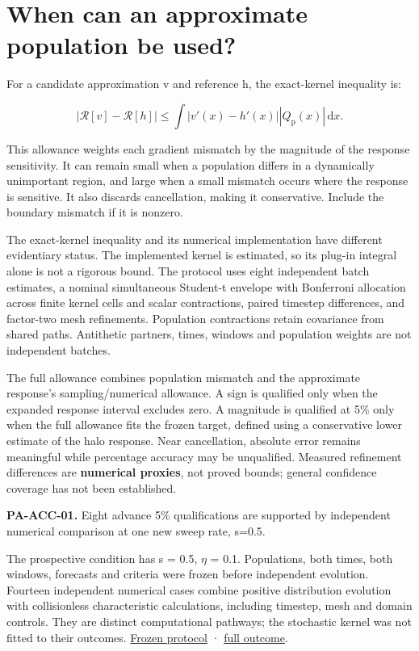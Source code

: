 \documentclass[fleqn,usenatbib]{mnras}
\begin{document}
\section{When can an approximate population be used?}\label{accuracy}

For a candidate approximation v and reference h, the exact-kernel inequality is:

\begin{equation}\label{EQ-ERR-01}
\left|\mathcal R[v]-\mathcal R[h]\right|
\leq \int\left|v'(x)-h'(x)\right|\left|Q_{\mathrm p}(x)\right|\,\mathrm dx.
\end{equation}

This allowance weights each gradient mismatch by the magnitude of the response sensitivity. It can remain small when a population differs in a dynamically unimportant region, and large when a small mismatch occurs where the response is sensitive. It also discards cancellation, making it conservative. Include the boundary mismatch if it is nonzero.

The exact-kernel inequality and its numerical implementation have different evidentiary status. The implemented kernel is estimated, so its plug-in integral alone is not a rigorous bound. The protocol uses eight independent batch estimates, a nominal simultaneous Student-t envelope with Bonferroni allocation across finite kernel cells and scalar contractions, paired timestep differences, and factor-two mesh refinements. Population contractions retain covariance from shared paths. Antithetic partners, times, windows and population weights are not independent batches.

The full allowance combines population mismatch and the approximate response's sampling/numerical allowance. A sign is qualified only when the expanded response interval excludes zero. A magnitude is qualified at 5\% only when the full allowance fits the frozen target, defined using a conservative lower estimate of the halo response. Near cancellation, absolute error remains meaningful while percentage accuracy may be unqualified. Measured refinement differences are \textbf{numerical proxies}, not proved bounds; general confidence coverage has not been established.

\textbf{PA-ACC-01.} Eight advance 5\% qualifications are supported by independent numerical comparison at one new sweep rate, s=0.5.

The prospective condition has s = 0.5, \(\eta\) = 0.1. Populations, both times, both windows, forecasts and criteria were frozen before independent evolution. Fourteen independent numerical cases combine positive distribution evolution with collisionless characteristic calculations, including timestep, mesh and domain controls. They are distinct computational pathways; the stochastic kernel was not fitted to their outcomes. \href{https://djova.ca/galaxy-bar/protocols/ACCURACY_PLAN.md}{Frozen protocol} · \href{https://djova.ca/galaxy-bar/diagnostics/population-accuracy/ACCURACY_OUTCOME_01.md}{full outcome}.
\end{document}
